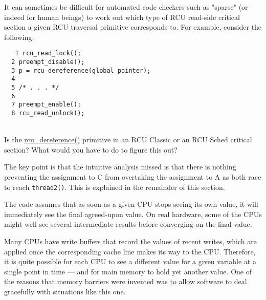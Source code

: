 It can sometimes be difficult for automated
code checkers such as "sparse" (or indeed for human beings) to
work out which type of RCU read-side critical section a given
RCU traversal primitive corresponds to.
For example, consider the following:
\\
\vspace{5pt}
\begin{minipage}[t]{\columnwidth}
{ \tt
~~1 rcu\_read\_lock();\\
~~2 preempt\_disable();\\
~~3 p = rcu\_dereference(global\_pointer);\\
~~4 \\
~~5 /* . . . */\\
~~6 \\
~~7 preempt\_enable();\\
~~8 rcu\_read\_unlock();\\
}
\end{minipage}
\vspace{5pt}
\\
Is the \url{rcu_dereference()} primitive in an RCU Classic
or an RCU Sched critical section?
What would you have to do to figure this out?


	The key point is that the intuitive analysis missed is that
	there is nothing preventing the assignment to C from overtaking
	the assignment to A as both race to reach {\tt thread2()}.
	This is explained in the remainder of this section.


	   The code assumes that as soon as a given CPU stops
	   seeing its own value, it will immediately see the
	   final agreed-upon value.
	   On real hardware, some of the CPUs might well see several
	   intermediate results before converging on the final value.


	   Many CPUs have write buffers that record the values of
	   recent writes, which are applied once the corresponding
	   cache line makes its way to the CPU.
	   Therefore, it is quite possible for each CPU to see a
	   different value for a given variable at a single point
	   in time --- and for main memory to hold yet another value.
	   One of the reasons that memory barriers were invented was
	   to allow software to deal gracefully with situations like
	   this one.

